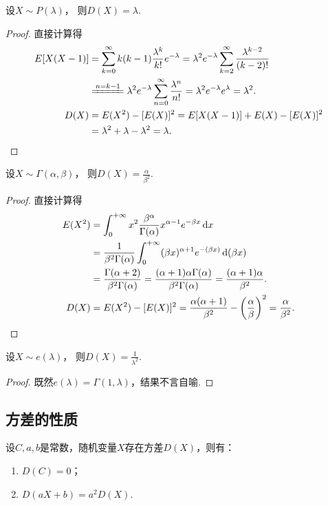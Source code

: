 \begin{proposition}
设\(X \sim P(\lambda)\)，
则\(D(X) = \lambda\).
\begin{proof}
直接计算得\begin{align*}
	E[X(X-1)]
	&= \sum_{k=0}^\infty {k(k-1) \frac{\lambda^k}{k!} e^{-\lambda}}
	= \lambda^2 e^{-\lambda} \sum_{k=2}^\infty {\frac{\lambda^{k-2}}{(k-2)!}} \\
	&\xlongequal{n=k-1} \lambda^2 e^{-\lambda} \sum_{n=0}^\infty {\frac{\lambda^n}{n!}}
	= \lambda^2 e^{-\lambda} e^\lambda = \lambda^2. \\
	D(X)
	&= E(X^2) - [E(X)]^2
	= E[X(X-1)] + E(X) - [E(X)]^2 \\
	&= \lambda^2 + \lambda - \lambda^2 = \lambda.
	\qedhere
\end{align*}
\end{proof}
\end{proposition}

\begin{proposition}
设\(X \sim \Gamma(\alpha,\beta)\)，
则\(D(X) = \frac{\alpha}{\beta^2}\).
\begin{proof}
\def\inti{\int_0^{+\infty}}%
直接计算得
\begin{align*}
	E(X^2) &= \int_0^{+\infty} x^2
		\frac{\beta^\alpha}{\Gamma(\alpha)} x^{\alpha-1} e^{-\beta x} \dd{x} \\
	&= \frac{1}{\beta^2 \Gamma(\alpha)}
		\int_0^{+\infty} (\beta x)^{\alpha+1} e^{-(\beta x)} \dd(\beta x) \\
	&= \frac{\Gamma(\alpha+2)}{\beta^2 \Gamma(\alpha)}
	= \frac{(\alpha+1) \alpha \Gamma(\alpha)}{\beta^2 \Gamma(\alpha)}
	= \frac{(\alpha+1) \alpha}{\beta^2}. \\
	D(X) &= E(X^2) - [E(X)]^2
	= \frac{\alpha (\alpha+1)}{\beta^2} - \left( \frac{\alpha}{\beta} \right)^2
	= \frac{\alpha}{\beta^2}.
	\qedhere
\end{align*}
\end{proof}
\end{proposition}

\begin{proposition}\label{theorem:方差.指数分布的方差}
设\(X \sim e(\lambda)\)，
则\(D(X) = \frac{1}{\lambda^2}\).
\begin{proof}
既然\(e(\lambda) = \Gamma(1,\lambda)\)，结果不言自喻.
\end{proof}
\end{proposition}

\subsection{方差的性质}
\begin{property}\label{theorem:随机变量的数字特征.方差的性质1}
设\(C,a,b\)是常数，随机变量\(X\)存在方差\(D(X)\)，则有：
\begin{enumerate}
	\item \(D(C) = 0\)；
	\item \(D(aX+b) = a^2 D(X)\).
\end{enumerate}
\end{property}


